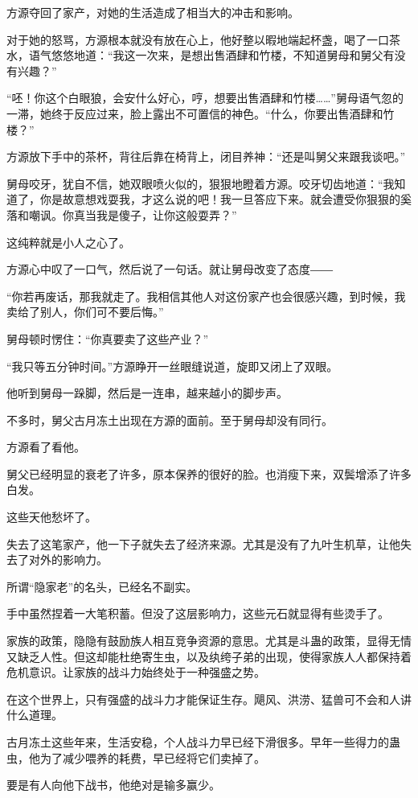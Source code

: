 \begin{this_body}
方源夺回了家产，对她的生活造成了相当大的冲击和影响。

对于她的怒骂，方源根本就没有放在心上，他好整以暇地端起杯盏，喝了一口茶水，语气悠悠地道：“我这一次来，是想出售酒肆和竹楼，不知道舅母和舅父有没有兴趣？”

“呸！你这个白眼狼，会安什么好心，哼，想要出售酒肆和竹楼……”舅母语气忽的一滞，她终于反应过来，脸上露出不可置信的神色。“什么，你要出售酒肆和竹楼？”

方源放下手中的茶杯，背往后靠在椅背上，闭目养神：“还是叫舅父来跟我谈吧。”

舅母咬牙，犹自不信，她双眼喷火似的，狠狠地瞪着方源。咬牙切齿地道：“我知道了，你是故意想戏耍我，才这么说的吧！我一旦答应下来。就会遭受你狠狠的奚落和嘲讽。你真当我是傻子，让你这般耍弄？”

这纯粹就是小人之心了。

方源心中叹了一口气，然后说了一句话。就让舅母改变了态度――

“你若再废话，那我就走了。我相信其他人对这份家产也会很感兴趣，到时候，我卖给了别人，你们可不要后悔。”

舅母顿时愣住：“你真要卖了这些产业？”

“我只等五分钟时间。”方源睁开一丝眼缝说道，旋即又闭上了双眼。

他听到舅母一跺脚，然后是一连串，越来越小的脚步声。

不多时，舅父古月冻土出现在方源的面前。至于舅母却没有同行。

方源看了看他。

舅父已经明显的衰老了许多，原本保养的很好的脸。也消瘦下来，双鬓增添了许多白发。

这些天他愁坏了。

失去了这笔家产，他一下子就失去了经济来源。尤其是没有了九叶生机草，让他失去了对外的影响力。

所谓“隐家老”的名头，已经名不副实。

手中虽然捏着一大笔积蓄。但没了这层影响力，这些元石就显得有些烫手了。

家族的政策，隐隐有鼓励族人相互竞争资源的意思。尤其是斗蛊的政策，显得无情又缺乏人性。但这却能杜绝寄生虫，以及纨绔子弟的出现，使得家族人人都保持着危机意识。让家族的战斗力始终处于一种强盛之势。

在这个世界上，只有强盛的战斗力才能保证生存。飓风、洪涝、猛兽可不会和人讲什么道理。

古月冻土这些年来，生活安稳，个人战斗力早已经下滑很多。早年一些得力的蛊虫，他为了减少喂养的耗费，早已经将它们卖掉了。

要是有人向他下战书，他绝对是输多赢少。


\end{this_body}
